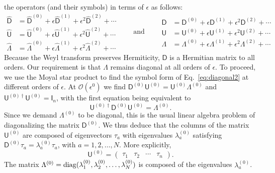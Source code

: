the operators (and their symbols) in terms of $\epsilon$ as follows:
%
\begin{equation}
  \begin{aligned}
    \widehat{\mathsf{D}} &= \widehat{\mathsf{D}}^{(0)} + \epsilon\widehat{\mathsf{D}}^{(1)} + \epsilon^{2}\widehat{\mathsf{D}}^{(2)} + \cdots\\
    \widehat{\mathsf{U}} &= \widehat{\mathsf{U}}^{(0)} + \epsilon\widehat{\mathsf{U}}^{(1)} + \epsilon^{2}\widehat{\mathsf{U}}^{(2)} + \cdots\\
    \widehat{\Lambda} &= \widehat{\Lambda}^{(0)} + \epsilon\widehat{\Lambda}^{(1)} + \epsilon^{2}\widehat{\Lambda}^{(2)} + \cdots
  \end{aligned}
  \qquad\text{and}\qquad
  \begin{aligned}
    {\mathsf{D}} &= {\mathsf{D}}^{(0)} + \epsilon{\mathsf{D}}^{(1)} + \epsilon^{2}{\mathsf{D}}^{(2)} + \cdots\\
    {\mathsf{U}} &= {\mathsf{U}}^{(0)} + \epsilon{\mathsf{U}}^{(1)} + \epsilon^{2}{\mathsf{U}}^{(2)} + \cdots\\
    {\Lambda} &= {\Lambda}^{(0)} + \epsilon{\Lambda}^{(1)} + \epsilon^{2}{\Lambda}^{(2)} + \cdots
  \end{aligned}
\end{equation}
%
Because the Weyl transform preserves Hermiticity, $\mathsf{D}$ is a Hermitian matrix to all orders.
Our requirement is that $\Lambda$ remains diagonal at all orders of $\epsilon$.
To proceed, we use the Moyal star product to find the symbol form of Eq.~\eqref{eq:diagonal2} at different orders of $\epsilon$.
At $\mathcal{O}(\epsilon^0)$ we find $\mathsf{D}^{(0)}\mathsf{U}^{(0)} = \mathsf{U}^{(0)}\Lambda^{(0)}$ and $\mathsf{U}^{(0)\dagger}\mathsf{U}^{(0)} = \mathsf{I}_{n}$, with the first equation being equivalent to
%
\begin{equation}
  \mathsf{U}^{(0)\dagger}\mathsf{D}^{(0)}\mathsf{U}^{(0)} = \Lambda^{(0)}.\label{eq:omega0}
\end{equation}
%
Since we demand $\Lambda^{(0)}$ to be diagonal, this is the usual linear algebra problem of diagonalizing the matrix $\mathsf{D}^{(0)}$.
We thus deduce that the columns of the matrix $\mathsf{U}^{(0)}$ are composed of eigenvectors $\tau_{a}$ with eigenvalues $\lambda^{(0)}_{a}$ satisfying $\mathsf{D}^{(0)}\tau_{a} = \lambda^{(0)}_{a}\tau_{a}$, with $a = 1,2,\ldots,N$.
More explicitly,
%
\begin{equation}
  \mathsf{U}^{(0)} =
  \begin{pmatrix}
    \tau_{1} & \tau_{2} & \cdots & \tau_{n}
  \end{pmatrix}.
\end{equation}
%
The matrix $\Lambda^{(0)} = \operatorname{diag}(\lambda_{1}^{(0)}, \lambda_{2}^{(0)}, \ldots, \lambda_{N}^{(0)})$ is composed of the eigenvalues $\lambda_{a}^{(0)}$.

